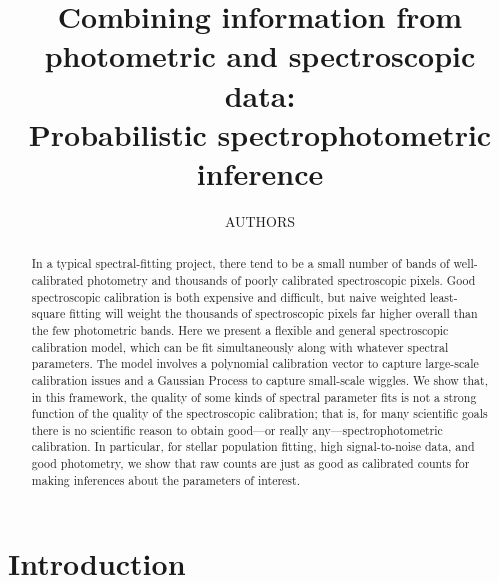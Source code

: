 \documentclass[iop,numberedappendix]{emulateapj}
\newcommand{\lick}{1}
\newcommand{\ccpp}{2}
\newcommand{\cds}{3}
\newcommand{\mpia}{4}
\begin{document}
\sloppy\sloppypar
\title{Combining information from photometric and spectroscopic data:\\
  Probabilistic spectrophotometric inference}
\author{
  AUTHORS}

\begin{abstract}
In a typical spectral-fitting project,
  there tend to be a small number of bands of well-calibrated photometry
  and thousands of poorly calibrated spectroscopic pixels.
Good spectroscopic calibration is both expensive and difficult,
  but naive weighted least-square fitting will weight
  the thousands of spectroscopic pixels far higher overall
  than the few photometric bands.
Here we present a flexible and general spectroscopic calibration model,
  which can be fit simultaneously along with whatever spectral parameters.
The model involves a polynomial calibration vector to capture large-scale calibration issues
  and a Gaussian Process to capture small-scale wiggles.
We show that, in this framework, the quality of some kinds of spectral parameter fits
  is not a strong function of the quality of the spectroscopic calibration;
  that is, for many scientific goals there is no scientific reason
  to obtain good---or really any---spectrophotometric calibration.
In particular, for stellar population fitting, high signal-to-noise data,
  and good photometry,
  we show that raw counts are just as good as calibrated counts for making inferences about the
  parameters of interest.
\end{abstract}


\section{Introduction}
\end{document}
